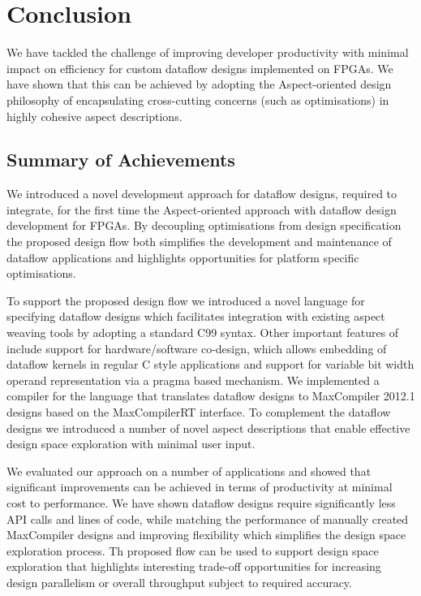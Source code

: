 \chapter{Conclusion}

We have tackled the challenge of improving developer productivity with
minimal impact on efficiency for custom dataflow designs implemented
on FPGAs. We have shown that this can be achieved by adopting the
Aspect-oriented design philosophy of encapsulating cross-cutting
concerns (such as optimisations) in highly cohesive aspect
descriptions.

\section{Summary of Achievements}
We introduced a novel development approach for dataflow designs,
required to integrate, for the first time the Aspect-oriented approach
with dataflow design development for FPGAs. By decoupling
optimisations from design specification the proposed design flow both
simplifies the development and maintenance of dataflow applications
and highlights opportunities for platform specific optimisations.

To support the proposed design flow we introduced \FAST{} a novel
language for specifying dataflow designs which facilitates integration
with existing aspect weaving tools by adopting a standard C99
syntax. Other important features of \FAST{} include support for
hardware/software co-design, which allows embedding of dataflow
kernels in regular C style applications and support for variable bit
width operand representation via a pragma based mechanism. We
implemented a compiler for the \FAST{} language that translates
\FAST{} dataflow designs to MaxCompiler 2012.1 designs based on the
MaxCompilerRT interface. To complement the \FAST{} dataflow designs we
introduced a number of novel aspect descriptions that enable effective
design space exploration with minimal user input.

We evaluated our approach on a number of applications and showed that
significant improvements can be achieved in terms of productivity at
minimal cost to performance. We have shown \FAST{} dataflow designs
require significantly less API calls and lines of code, while matching
the performance of manually created MaxCompiler designs and improving
flexibility which simplifies the design space exploration process. Th
proposed flow can be used to support design space exploration that
highlights interesting trade-off opportunities for increasing design
parallelism or overall throughput subject to required accuracy.

